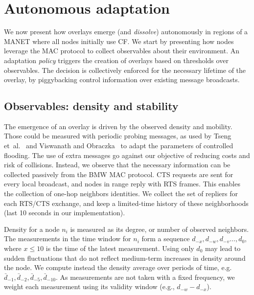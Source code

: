 
\section{Autonomous adaptation}
\label{sec:adaptation}

We now present how overlays emerge (and \emph{dissolve}) autonomously in regions of a MANET where all nodes initially use CF.
We start by presenting how nodes leverage the MAC protocol to collect observables about their environment.
An adaptation \emph{policy} triggers the creation of overlays based on thresholds over observables.
The decision is collectively enforced for the necessary lifetime of the overlay, by piggybacking control information over existing message broadcasts.

\subsection{Observables: density and stability}
\label{sec:adaptation:observables}


The emergence of an overlay is driven by the observed density and mobility.
Those could be measured with periodic probing messages, as used by Tseng et~al.~\cite{2001:AAR:876878.879323} and Viswanath and Obraczka~\cite{adaptive_group_com_iscc02} to adapt the parameters of controlled flooding.
The use of extra messages go against our objective of reducing costs and risk of collisions.
Instead, we observe that the necessary information can be collected passively from the BMW MAC protocol.
CTS requests are sent for every local broadcast, and nodes in range reply with RTS frames.
This enables the collection of one-hop neighbors identities.
We collect the set of repliers for each RTS/CTS exchange, and keep a limited-time history of these neighborhoods (last 10 seconds in our implementation).

Density for a node $n_i$ is measured as its degree, or number of observed neighbors.
The measurements in the time window for $n_i$ form a sequence $d_{-x},d_{-w},d_{-v}\dots,d_0$, where $x\leq 10$ is the time of the latest measurement. 
Using only $d_0$ may lead to sudden fluctuations that do not reflect medium-term increases in density around the node.
We compute instead the density average over periods of time, e.g. $\bar{d}_{-1},\bar{d}_{-2},\bar{d}_{-5},\bar{d}_{-10}$.
As measurements are not taken with a fixed frequency, we weight each measurement using its validity window (e.g., $d_{-w}-d_{-x}$).


